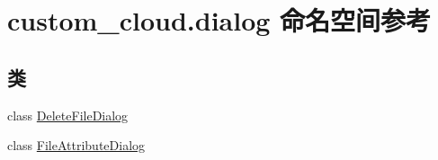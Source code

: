 \hypertarget{namespacecustom__cloud_1_1dialog}{}\section{custom\+\_\+cloud.\+dialog 命名空间参考}
\label{namespacecustom__cloud_1_1dialog}
\subsection*{类}
\begin{DoxyCompactItemize}
\item 
class \hyperlink{classcustom__cloud_1_1dialog_1_1_delete_file_dialog}{Delete\+File\+Dialog}
\item 
class \hyperlink{classcustom__cloud_1_1dialog_1_1_file_attribute_dialog}{File\+Attribute\+Dialog}
\end{DoxyCompactItemize}
